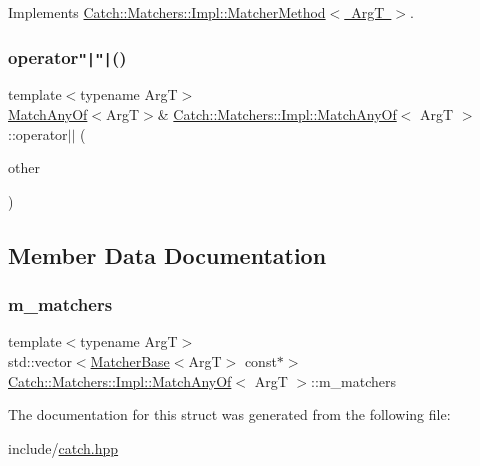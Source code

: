 Implements \mbox{\hyperlink{structCatch_1_1Matchers_1_1Impl_1_1MatcherMethod_ae0920ff9e817acf08e1bb0cbcb044e30}{Catch\+::\+Matchers\+::\+Impl\+::\+Matcher\+Method$<$ Arg\+T $>$}}.

\mbox{\label{structCatch_1_1Matchers_1_1Impl_1_1MatchAnyOf_a44d7582dbe09fc31b9a5ba8a6367b506}} 
\subsubsection{\texorpdfstring{operator\texttt{"|}\texttt{"|}()}{operator||()}}
{\footnotesize\ttfamily template$<$typename ArgT$>$ \\
\mbox{\hyperlink{structCatch_1_1Matchers_1_1Impl_1_1MatchAnyOf}{Match\+Any\+Of}}$<$ArgT$>$\& \mbox{\hyperlink{structCatch_1_1Matchers_1_1Impl_1_1MatchAnyOf}{Catch\+::\+Matchers\+::\+Impl\+::\+Match\+Any\+Of}}$<$ ArgT $>$\+::operator$\vert$$\vert$ (\begin{DoxyParamCaption}\item[{\mbox{\hyperlink{structCatch_1_1Matchers_1_1Impl_1_1MatcherBase}{Matcher\+Base}}$<$ ArgT $>$ const \&}]{other }\end{DoxyParamCaption})\hspace{0.3cm}{\ttfamily [inline]}}



\subsection{Member Data Documentation}
\mbox{\label{structCatch_1_1Matchers_1_1Impl_1_1MatchAnyOf_a1fb1119e6110dc15b8d5262ec0aeddd5}} 
\subsubsection{\texorpdfstring{m\+\_\+matchers}{m\_matchers}}
{\footnotesize\ttfamily template$<$typename ArgT$>$ \\
std\+::vector$<$\mbox{\hyperlink{structCatch_1_1Matchers_1_1Impl_1_1MatcherBase}{Matcher\+Base}}$<$ArgT$>$ const$\ast$$>$ \mbox{\hyperlink{structCatch_1_1Matchers_1_1Impl_1_1MatchAnyOf}{Catch\+::\+Matchers\+::\+Impl\+::\+Match\+Any\+Of}}$<$ ArgT $>$\+::m\+\_\+matchers}



The documentation for this struct was generated from the following file\+:\begin{DoxyCompactItemize}
\item 
include/\mbox{\hyperlink{catch_8hpp}{catch.\+hpp}}\end{DoxyCompactItemize}

